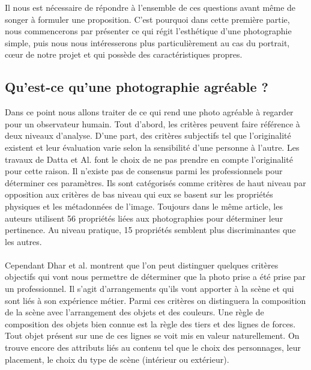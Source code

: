\documentclass[11pt, french,screen]{report-rd-info}
\begin{document}
Il nous est nécessaire de répondre à l’ensemble de ces questions avant même de songer à formuler une proposition. C’est pourquoi dans cette première partie, nous commencerons par présenter ce qui régit l'esthétique d’une photographie simple, puis nous nous intéresserons plus particulièrement au cas du portrait, cœur de notre projet et qui possède des caractéristiques propres.
\subsection{Qu’est-ce qu’une photographie agréable ?}
Dans ce point nous allons traiter de ce qui rend une photo agréable à regarder pour un observateur humain. Tout d’abord, les critères peuvent faire référence à deux niveaux d'analyse.
\label{originalite}
D’une part, des critères subjectifs tel que l’originalité existent et  leur évaluation varie selon la sensibilité d’une personne à l’autre. Les travaux de Datta et Al.\cite{Datta} font le choix de ne pas prendre en compte l'originalité pour cette raison.  Il n’existe pas de consensus parmi les professionnels pour déterminer ces paramètres. Ils sont catégorisés comme critères de haut niveau par opposition aux critères de bas niveau qui eux se basent sur les propriétés physiques et les métadonnées de l’image. Toujours dans le même article, les auteurs utilisent 56 propriétés liées aux photographies pour déterminer leur pertinence. Au niveau pratique, 15 propriétés semblent plus discriminantes que les autres.
\paragraph*{}
Cependant Dhar et al. \cite{Dhar} montrent que l’on peut distinguer quelques critères objectifs qui vont nous permettre de déterminer que la photo prise a été prise par un professionnel. Il s’agit  d’arrangements qu’ils vont apporter à la scène et qui sont liés à son expérience métier. Parmi ces critères on distinguera la composition de la scène avec l'arrangement des objets et des couleurs. Une règle de composition des objets bien connue est la règle des tiers et des lignes de forces. Tout objet présent sur une de ces lignes se voit mis en valeur naturellement. On trouve encore des attributs liés au contenu tel que le choix des personnages, leur placement, le choix du type de scène (intérieur ou extérieur). 
\end{document}

